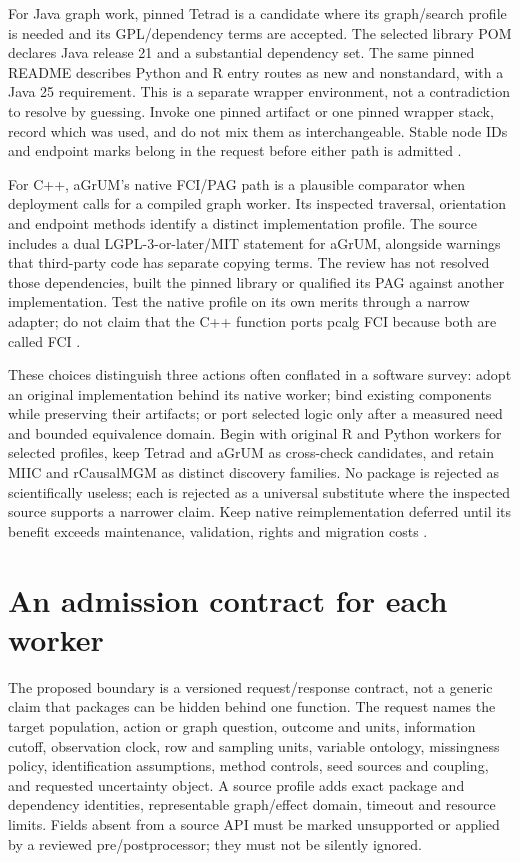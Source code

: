 For Java graph work, pinned Tetrad is a candidate where its graph/search profile
is needed and its GPL/dependency terms are accepted. The selected library POM
declares Java release 21 and a substantial dependency set. The same pinned
README describes Python and R entry routes as new and nonstandard, with a Java
25 requirement. This is a separate wrapper environment, not a contradiction
to resolve by guessing. Invoke one pinned artifact or one pinned wrapper stack,
record which was used, and do not mix them as interchangeable. Stable node IDs
and endpoint marks belong in the request before either path is admitted
\citep{exec13_tetrad_reuse_primary,exec14_java_latent_sources}.

For C++, aGrUM's native FCI/PAG path is a plausible comparator when deployment
calls for a compiled graph worker. Its inspected traversal, orientation and
endpoint methods identify a distinct implementation profile. The source
includes a dual LGPL-3-or-later/MIT statement for aGrUM, alongside warnings
that third-party code has separate copying terms. The review has not resolved
those dependencies, built the pinned library or qualified its PAG against
another implementation. Test the native profile on its own merits through a
narrow adapter; do not claim that the C++ function ports pcalg FCI because both
are called FCI \citep{exec14_native_agrum}.

These choices distinguish three actions often conflated in a software survey:
adopt an original implementation behind its native worker; bind existing
components while preserving their artifacts; or port selected logic only after
a measured need and bounded equivalence domain. Begin with original R and
Python workers for selected profiles, keep Tetrad and aGrUM as cross-check
candidates, and retain MIIC and rCausalMGM as distinct discovery families. No
package is rejected as scientifically useless; each is rejected as a universal
substitute where the inspected source supports a narrower claim. Keep native
reimplementation deferred until its benefit exceeds maintenance, validation,
rights and migration costs \citep{exec17_s9_route_decisions}.

\section{An admission contract for each worker}

The proposed boundary is a versioned request/response contract, not a generic
claim that packages can be hidden behind one function. The request names the
target population, action or graph question, outcome and units, information
cutoff, observation clock, row and sampling units, variable ontology,
missingness policy, identification assumptions, method controls, seed sources
and coupling, and requested uncertainty object. A source profile adds exact
package and dependency identities, representable graph/effect domain, timeout
and resource limits. Fields absent from a source API must be marked unsupported
or applied by a reviewed pre/postprocessor; they must not be silently ignored.

